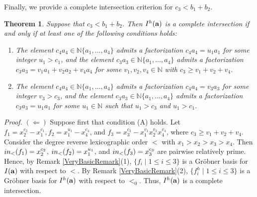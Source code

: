 \documentclass[10pt,a4paper]{amsart}
\newtheorem{thm1}{Theorem}[section]
\begin{document}
Finally, we provide a complete intersection criterion for $c_3<b_1+b_2$.

\begin{thm1} \label{Basic26} Suppose that $c_3<b_1+b_2$. Then $I^{h}({\bf a})$ is a complete intersection if and only if at least one of the following conditions holds: \begin{enumerate} \item[(A)] The element $c_{4}a_4 \in \mathbb{N}\{a_1,\ldots,a_4\}$ admits a factorization $c_{4}a_4=u_1a_{1}$ for some integer $u_{1}>c_1$, and the element $c_{3}a_3 \in \mathbb{N}\{a_1,\ldots,a_4\}$ admits a factorization $c_{3}a_3=v_1a_{1}+v_2a_{2}+v_4a_4$ for some $v_1, v_2, v_4 \in \mathbb{N}$ with $c_3 \geq v_1+v_2+v_4$.
\item[(B)] The element $c_{4}a_4 \in \mathbb{N}\{a_1,\ldots,a_4\}$ admits a factorization $c_{4}a_4=v_3a_{3}$ for some integer $v_{3}>c_3$, and the element $c_{3}a_3 \in \mathbb{N}\{a_1,\ldots,a_4\}$ admits a factorization $c_{3}a_3=u_1a_{1}$ for some $u_1 \in \mathbb{N}$ such that $u_1>c_3$ and $u_1>c_1$.
\end{enumerate}
\end{thm1}

{\em \noindent Proof.} $(\Leftarrow)$ Suppose first that condition (A) holds. Let $f_{1}=x_{2}^{c_2}-x_{1}^{c_1}, f_{2}=x_{1}^{u_1}-x_{4}^{c_4}$, and $f_{3}=x_{3}^{c_3}-x_{1}^{v_1}x_{2}^{v_2}x_4^{v_4}$, where $c_3 \geq v_1+v_2+v_4$. Consider the degree reverse lexicographic order $<$ with $x_1>x_2>x_3>x_4$. Then ${\rm in}_{<}(f_{1})=x_{2}^{c_2}$, ${\rm in}_{<}(f_{2})=x_{1}^{u_1}$, and ${\rm in}_{<}(f_{3})=x_{3}^{c_3}$ are pairwise relatively prime. Hence, by Remark \ref{VeryBasicRemark}(1), $\{f_{i} \mid 1 \leq i \leq 3\}$ is a Gr\"obner basis for $I({\bf a})$ with respect to $<$. By Remark \ref{VeryBasicRemark}(2), $\{f_{i}^h \mid 1 \leq i \leq 3\}$ is a Gr\"obner basis for $I^{h}({\bf a})$ with respect to $<_{0}$. Thus, $I^{h}({\bf a})$ is a complete intersection. 
\end{document}
